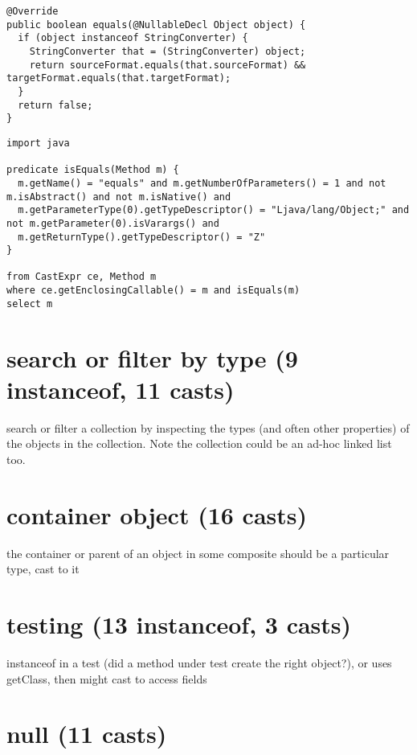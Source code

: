 \documentclass{usiinfdocprop}
\begin{document}
\lstset{language=java,label= ,caption= ,captionpos=b,numbers=none}
\begin{lstlisting}
@Override
public boolean equals(@NullableDecl Object object) {
  if (object instanceof StringConverter) {
    StringConverter that = (StringConverter) object;
    return sourceFormat.equals(that.sourceFormat) && targetFormat.equals(that.targetFormat);
  }
  return false;
}
\end{lstlisting}

\lstset{language=ql,label= ,caption= ,captionpos=b,numbers=none}
\begin{lstlisting}
import java

predicate isEquals(Method m) {
  m.getName() = "equals" and m.getNumberOfParameters() = 1 and not m.isAbstract() and not m.isNative() and
  m.getParameterType(0).getTypeDescriptor() = "Ljava/lang/Object;" and not m.getParameter(0).isVarargs() and
  m.getReturnType().getTypeDescriptor() = "Z"
}

from CastExpr ce, Method m
where ce.getEnclosingCallable() = m and isEquals(m)
select m
\end{lstlisting}

\section{search or filter by type (9 instanceof, 11 casts)}
\label{sec:org3623e52}
search or filter a collection by inspecting the types (and often other properties) of the objects in the collection. Note the collection could be an ad-hoc linked list too. 

\section{container object (16 casts)}
\label{sec:orga64a7a6}
the container or parent of an object in some composite should be a particular type, cast to it 

\section{testing (13 instanceof, 3 casts)}
\label{sec:orgbe367ed}
instanceof in a test (did a method under test create the right object?), or uses getClass, then might cast to access fields 

\section{null (11 casts)}
\label{sec:orgfe4e962}
\end{document}
